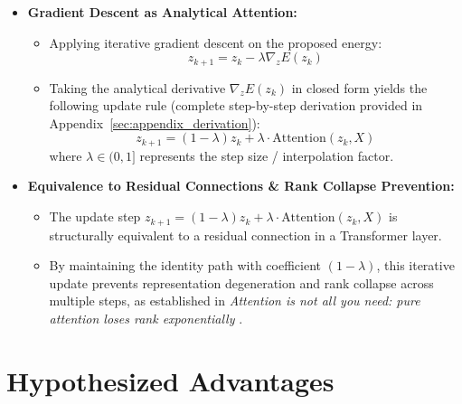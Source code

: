 \documentclass[11pt,a4paper]{article}
\begin{document}
\begin{itemize}[leftmargin=1.5em]
    \item \textbf{Gradient Descent as Analytical Attention:}
    \begin{itemize}[leftmargin=1.2em]
        \item Applying iterative gradient descent on the proposed energy:
        \begin{equation}
            z_{k+1} = z_k - \lambda \nabla_z E(z_k)
        \end{equation}
        \item Taking the analytical derivative $\nabla_z E(z_k)$ in closed form yields the following update rule (complete step-by-step derivation provided in Appendix~\ref{sec:appendix_derivation}):
        \begin{equation}
            z_{k+1} = (1 - \lambda) z_k + \lambda \cdot \text{Attention}(z_k, X)
        \end{equation}
        where $\lambda \in (0, 1]$ represents the step size / interpolation factor.
    \end{itemize}

    \item \textbf{Equivalence to Residual Connections \& Rank Collapse Prevention:}
    \begin{itemize}[leftmargin=1.2em]
        \item The update step $z_{k+1} = (1 - \lambda) z_k + \lambda \cdot \text{Attention}(z_k, X)$ is structurally equivalent to a residual connection in a Transformer layer.
        \item By maintaining the identity path with coefficient $(1 - \lambda)$, this iterative update prevents representation degeneration and rank collapse across multiple steps, as established in \textit{Attention is not all you need: pure attention loses rank exponentially} \cite{dong2021attention}.
    \end{itemize}
\end{itemize}

\section{Hypothesized Advantages}
\label{sec:advantages}
\end{document}
